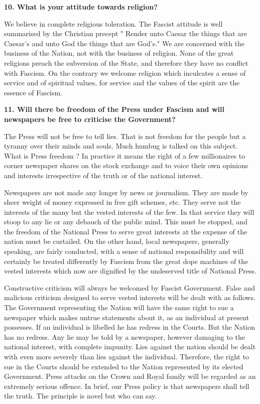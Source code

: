 \documentclass{book}
\begin{document}
\begin{flushleft}
\textbf{10. What is your attitude towards religion?}

We believe in complete religious toleration. The Fascist attitude is well summarised by the
Christian precept " Render unto Caesar the things that are Caesar's and unto God the things that
are God's."
We are concerned with the business of the Nation, not with the business of religion. None of the
great religions preach the subversion of the State, and therefore they have no conflict with
Fascism. On the contrary we welcome religion which inculcates a sense of service and of spiritual values, for service and the values
of the spirit are the essence of Fascism.
\end{flushleft}

\begin{flushright}
\textbf{11. Will there be freedom of the Press under Fascism and
    will newspapers be free to criticise the Government?}

The Press will not be free to tell lies. That is not freedom for the people but a tyranny over their
minds and souls. Much humbug is talked on this subject. What is Press freedom ? In practice it
means the right of a few millionaires to corner newspaper shares on the stock exchange and to
voice their own opinions and interests irrespective of the truth or of the national interest.

Newspapers are not made any longer by news or journalism. They are made by sheer weight of
money expressed in free gift schemes, etc. They serve not the interests of the many but the
vested interests of the few. In that service they will stoop to any lie or any debauch of the public
mind. This must be stopped, and the freedom of the National Press to serve great interests at the
expense of the nation must be curtailed. On the other hand, local newspapers, generally speaking,
are fairly conducted, with a sense of national responsibility and will certainly be treated
differently by Fascism from the great dope machines of the vested interests which now are
dignified by the undeserved title of National Press.

Constructive criticism will always be welcomed by Fascist Government. False and malicious
criticism designed to serve vested interests will be dealt with as follows. The Government
representing the Nation will have the same right to sue a newspaper which makes untrue
statements about it, as an individual at present possesses. If an individual is libelled he has
redress in the Courts. But the Nation has no redress. Any lie may be told by a newspaper,
however damaging to the national interest, with complete impunity. Lies against the nation
should be dealt with even more severely than lies against the individual. Therefore, the right to
sue in the Courts should be extended to the Nation represented by its elected Government. Press attacks on the Crown and Royal family will be regarded as an extremely serious offence. In brief,
our Press policy is that newspapers shall tell the truth. The principle is novel but who can say.
\end{flushright}
\end{document}
